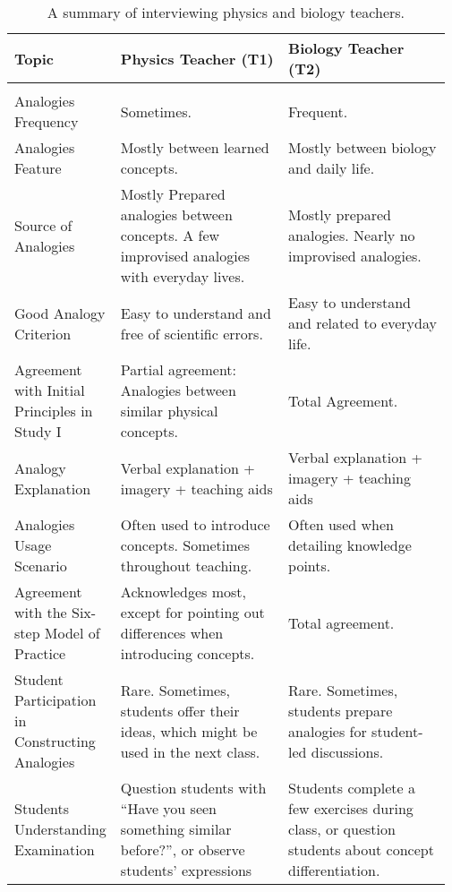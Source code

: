 \begin{table*}[t]
\centering
\small
\caption{A summary of interviewing physics and biology teachers.} \label{tab:findings_in_study2_pre_class_interview}
\begin{tabular}{@{}p{0.2\linewidth}p{0.39\linewidth}p{0.38\linewidth}@{}}
\toprule
\textbf{Topic} & \textbf{Physics Teacher (T1)} & \textbf{Biology Teacher (T2)} \\ 
\midrule
\multicolumn{3}{c}{\cellcolor[gray]{0.95}{\textbf{Analogy Usage Exploration}}} \\
\midrule
Analogies Frequency & Sometimes. & Frequent. \\
\midrule
Analogies Feature & Mostly between learned concepts. & Mostly between biology and daily life. \\
\midrule
Source of Analogies & Mostly Prepared analogies between concepts. \newline A few improvised analogies with everyday lives. & Mostly prepared analogies. \newline Nearly no improvised analogies. \\
\midrule
Good Analogy Criterion & Easy to understand and free of scientific errors. & Easy to understand and related to everyday life. \\
\midrule
Agreement with Initial Principles in Study I & Partial agreement: Analogies between similar physical concepts. & Total Agreement. \\
\midrule
Analogy Explanation & Verbal explanation + imagery + teaching aids & Verbal explanation + imagery + teaching aids \\
\midrule
Analogies Usage Scenario & Often used to introduce concepts. \newline Sometimes throughout teaching. & Often used when detailing knowledge points. \\
\midrule
Agreement with the Six-step Model of Practice~\cite{richland_analogy_2015} & Acknowledges most, except for pointing out differences when introducing concepts. & Total agreement. \\
\midrule
Student Participation in Constructing Analogies & Rare. Sometimes, students offer their ideas, which might be used in the next class. & Rare. Sometimes, students prepare analogies for student-led discussions. \\
\midrule
Students Understanding Examination & Question students with ``Have you seen something similar before?'', or observe students' expressions & Students complete a few exercises during class, or question students about concept differentiation. \\

\end{tabular}
\end{table*}
